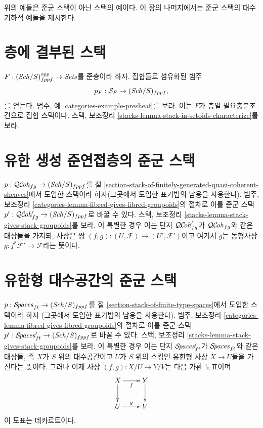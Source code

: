 \noindent
위의 예들은 준군 스택이 아닌 스택의 예이다. 이 장의 나머지에서는
준군 스택의 대수기하적 예들을 제시한다.



\section{층에 결부된 스택}
\label{section-stack-associated-to-sheaf}

\noindent
$F : (\mathit{Sch}/S)_{fppf}^{opp} \to \textit{Sets}$를 준층이라 하자.
집합들로 섬유화된 범주
$$
p_F : \mathcal{S}_F \to (\mathit{Sch}/S)_{fppf},
$$
를 얻는다. 범주, 예 \ref{categories-example-presheaf}를 보라.
이는 $F$가 층일 필요충분조건으로 집합 스택이다. 스택, 보조정리
\ref{stacks-lemma-stack-in-setoids-characterize}를 보라.



\section{유한 생성 준연접층의 준군 스택}
\label{section-stack-in-groupoids-of-quasi-coherent-sheaves}

\noindent
$p : \mathcal{QC}\!\mathit{oh}_{fg} \to (\mathit{Sch}/S)_{fppf}$를 절
\ref{section-stack-of-finitely-generated-quasi-coherent-sheaves}에서
도입한 스택이라 하자(그곳에서 도입한 표기법의 남용을 사용한다).
범주, 보조정리
\ref{categories-lemma-fibred-gives-fibred-groupoids}의 절차로 이를 준군 스택
$p' : \mathcal{QC}\!\mathit{oh}_{fg}' \to (\mathit{Sch}/S)_{fppf}$로 바꿀 수 있다. 스택,
보조정리 \ref{stacks-lemma-stack-gives-stack-groupoids}를 보라.
이 특별한 경우 이는 단지 $\mathcal{QC}\!\mathit{oh}_{fg}'$가 $\mathcal{QC}\!\mathit{oh}_{fg}$와 같은
대상들을 가지되, 사상은 쌍
$(f, g) : (U, \mathcal{F}) \to (U', \mathcal{F}')$이고 여기서 $g$는
동형사상 $g : f^*\mathcal{F}' \to \mathcal{F}$라는 뜻이다.


\section{유한형 대수공간의 준군 스택}
\label{section-stack-in-groupoids-of-finite-type-spaces}

\noindent
$p : \mathcal{S}\!\mathit{paces}_{ft} \to (\mathit{Sch}/S)_{fppf}$를 절
\ref{section-stack-of-finite-type-spaces}에서 도입한 스택이라 하자
(그곳에서 도입한 표기법의 남용을 사용한다). 범주, 보조정리
\ref{categories-lemma-fibred-gives-fibred-groupoids}의 절차로 이를 준군 스택
$p' : \mathcal{S}\!\mathit{paces}_{ft}' \to (\mathit{Sch}/S)_{fppf}$로 바꿀 수 있다. 스택,
보조정리 \ref{stacks-lemma-stack-gives-stack-groupoids}를 보라.
이 특별한 경우 이는 단지 $\mathcal{S}\!\mathit{paces}_{ft}'$가 $\mathcal{S}\!\mathit{paces}_{ft}$와
같은 대상들, 즉 $X$가 $S$ 위의 대수공간이고 $U$가 $S$ 위의 스킴인
유한형 사상 $X \to U$들을 가진다는 뜻이다. 그러나 이제 사상
$(f, g) : X/U \to Y/V$는 다음 가환 도표이며
$$
\xymatrix{
X \ar[d] \ar[r]_f & Y \ar[d] \\
U \ar[r]^g & V
}
$$
이 도표는 데카르트이다.



